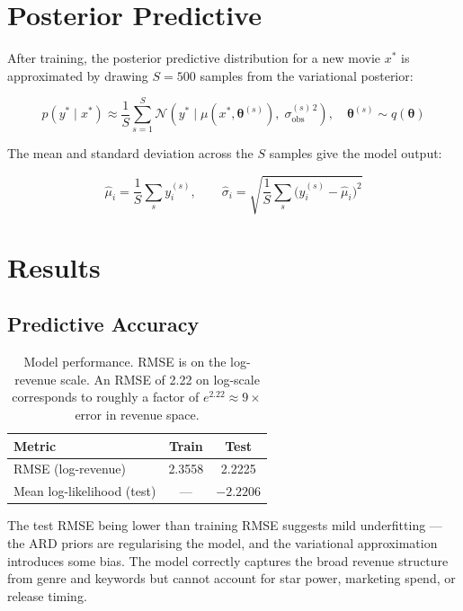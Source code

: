 \documentclass[12pt,a4paper]{article}
\begin{document}
\section{Posterior Predictive}

After training, the posterior predictive distribution for a new movie $x^*$
is approximated by drawing $S = 500$ samples from the variational posterior:

\begin{equation}
  p(y^* \mid x^*) \approx \frac{1}{S} \sum_{s=1}^{S}
    \mathcal{N}\!\left(y^* \;\big|\; \mu(x^*, \boldsymbol{\theta}^{(s)}),\;
    \sigma_\text{obs}^{(s)\,2}\right), \quad
    \boldsymbol{\theta}^{(s)} \sim q(\boldsymbol{\theta})
\end{equation}

The mean and standard deviation across the $S$ samples give the model output:

\begin{equation}
  \hat{\mu}_i = \frac{1}{S}\sum_s y_i^{(s)}, \qquad
  \hat{\sigma}_i = \sqrt{\frac{1}{S}\sum_s \bigl(y_i^{(s)} - \hat{\mu}_i\bigr)^2}
\end{equation}

\section{Results}

\subsection{Predictive Accuracy}

\begin{table}[H]
\centering
\begin{tabular}{lcc}
\toprule
\textbf{Metric} & \textbf{Train} & \textbf{Test} \\
\midrule
RMSE (log-revenue)           & 2.3558 & 2.2225 \\
Mean log-likelihood (test)   & ---    & $-2.2206$ \\
\bottomrule
\end{tabular}
\caption{Model performance. RMSE is on the log-revenue scale.
An RMSE of 2.22 on log-scale corresponds to roughly a factor of
$e^{2.22} \approx 9\times$ error in revenue space.}
\end{table}

\noindent The test RMSE being lower than training RMSE suggests mild
underfitting — the ARD priors are regularising the model, and the
variational approximation introduces some bias. The model correctly
captures the broad revenue structure from genre and keywords but cannot
account for star power, marketing spend, or release timing.
\end{document}
